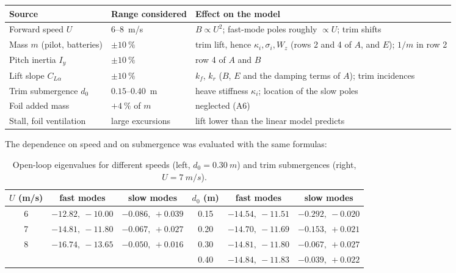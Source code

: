 \documentclass[11pt,a4paper]{article}
\begin{document}
\begin{table}[h]
\centering
\begin{tabular}{@{}llp{7.2cm}@{}}
\toprule
Source & Range considered & Effect on the model \\ \midrule
Forward speed $U$ & $6$--\SI{8}{m/s} & $B\propto U^2$; fast-mode poles roughly $\propto U$; trim shifts \\
Mass $m$ (pilot, batteries) & $\pm\SI{10}{\percent}$ & trim lift, hence $\kappa_i,\sigma_i,W_z$ (rows 2 and 4 of $A$, and $E$); $1/m$ in row 2 \\
Pitch inertia $I_y$ & $\pm\SI{10}{\percent}$ & row 4 of $A$ and $B$ \\
Lift slope $C_{L\alpha}$ & $\pm\SI{10}{\percent}$ & $k_f$, $k_r$ ($B$, $E$ and the damping terms of $A$); trim incidences \\
Trim submergence $d_0$ & $0.15$--\SI{0.40}{m} & heave stiffness $\kappa_i$; location of the slow poles \\
Foil added mass & $+\SI{4}{\percent}$ of $m$ & neglected (A6) \\
Stall, foil ventilation & large excursions & lift lower than the linear model predicts \\
\bottomrule
\end{tabular}
\end{table}

The dependence on speed and on submergence was evaluated with the same formulas:

\begin{table}[h]
\centering
\caption{Open-loop eigenvalues for different speeds (left, $d_0=\SI{0.30}{m}$)
and trim submergences (right, $U=\SI{7}{m/s}$).}
\begin{tabular}{@{}ccc@{\hspace{3em}}ccc@{}}
\toprule
$U$ (\si{m/s}) & fast modes & slow modes &
$d_0$ (\si{m}) & fast modes & slow modes \\ \midrule
6 & $-12.82,\ -10.00$ & $-0.086,\ +0.039$ &
0.15 & $-14.54,\ -11.51$ & $-0.292,\ -0.020$ \\
7 & $-14.81,\ -11.80$ & $-0.067,\ +0.027$ &
0.20 & $-14.70,\ -11.69$ & $-0.153,\ +0.021$ \\
8 & $-16.74,\ -13.65$ & $-0.050,\ +0.016$ &
0.30 & $-14.81,\ -11.80$ & $-0.067,\ +0.027$ \\
  &  &  &
0.40 & $-14.84,\ -11.83$ & $-0.039,\ +0.022$ \\
\bottomrule
\end{tabular}
\end{table}
\end{document}
